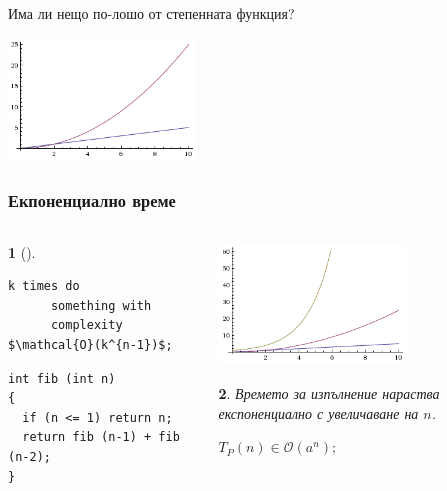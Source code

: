 \documentclass{beamer}
\newtheorem*{remark}{}
\begin{document}
\begin{frame}
\centerline{Има ли нещо по-лошо от степенната функция?}

\begin{center}
  \includegraphics[width=5cm]{images/quadraticf}
\end{center}
\end{frame}


\begin{frame}[fragile]
\frametitle{Екпоненциално време}

\vspace{-30px}

\begin{columns}[t]
  \begin{column}{0.6\textwidth}
\begin{remark}[]
  \begin{lstlisting}[mathescape]
  k times do 
      something with 
      complexity $\mathcal{O}(k^{n-1})$;
  \end{lstlisting}
\end{remark}

\begin{flushleft}
\begin{lstlisting}
int fib (int n)
{
  if (n <= 1) return n;
  return fib (n-1) + fib (n-2);
}
\end{lstlisting}
\end{flushleft}




  \end{column}
  \begin{column}{0.4\textwidth}

   \includegraphics[width=5cm]{images/exponential}
    \begin{flushleft}
    \begin{remark}
      Времето за изпълнение нараства експоненциално с увеличаване на $n$.

      $T_P(n) \in \mathcal{O}(a^n);$
    \end{remark}
      
    \end{flushleft}


  \end{column}
\end{columns}

\end{frame}
\end{document}
